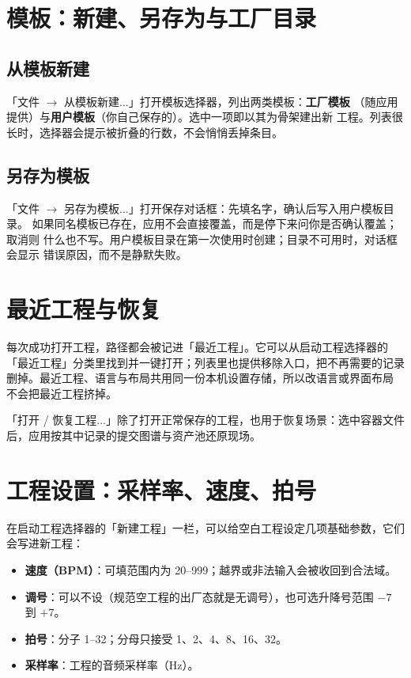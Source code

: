\section{模板：新建、另存为与工厂目录}

\subsection{从模板新建}

「文件 $\to$ 从模板新建...」打开模板选择器，列出两类模板：\textbf{工厂模板}
（随应用提供）与\textbf{用户模板}（你自己保存的）。选中一项即以其为骨架建出新
工程。列表很长时，选择器会提示被折叠的行数，不会悄悄丢掉条目。

\subsection{另存为模板}

「文件 $\to$ 另存为模板...」打开保存对话框：先填名字，确认后写入用户模板目录。
如果同名模板已存在，应用不会直接覆盖，而是停下来问你是否确认覆盖；取消则
什么也不写。用户模板目录在第一次使用时创建；目录不可用时，对话框会显示
错误原因，而不是静默失败。


\section{最近工程与恢复}

每次成功打开工程，路径都会被记进「最近工程」。它可以从启动工程选择器的
「最近工程」分类里找到并一键打开；列表里也提供移除入口，把不再需要的记录
删掉。最近工程、语言与布局共用同一份本机设置存储，所以改语言或界面布局
不会把最近工程挤掉。

「打开 / 恢复工程...」除了打开正常保存的工程，也用于恢复场景：选中容器文件
后，应用按其中记录的提交图谱与资产池还原现场。

\section{工程设置：采样率、速度、拍号}

在启动工程选择器的「新建工程」一栏，可以给空白工程设定几项基础参数，它们
会写进新工程：

\begin{itemize}
  \item \textbf{速度（BPM）}：可填范围内为 20--999；越界或非法输入会被收回到合法域。
  \item \textbf{调号}：可以不设（规范空工程的出厂态就是无调号），也可选升降号范围 $-7$ 到 $+7$。
  \item \textbf{拍号}：分子 1--32；分母只接受 1、2、4、8、16、32。
  \item \textbf{采样率}：工程的音频采样率（Hz）。
\end{itemize}

